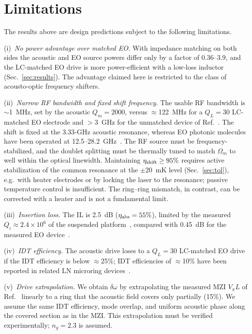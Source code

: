 \documentclass[aps,prapplied,reprint,superscriptaddress,amsmath,amssymb,floatfix]{revtex4-2}
\newcommand{\etash}{\eta_{\rm shift}}
\newcommand{\etaabs}{\eta_{\rm abs}}
\begin{document}
\section{Limitations}\label{sec:lim}
The results above are design predictions subject to the following limitations.

(i)~\emph{No power advantage over matched EO.} With impedance matching on both sides the acoustic and EO source powers differ only by a factor of 0.36--3.9, and the LC-matched EO drive is more power-efficient with a low-loss inductor (Sec.~\ref{sec:results}). The advantage claimed here is restricted to the class of acousto-optic frequency shifters.

(ii)~\emph{Narrow RF bandwidth and fixed shift frequency.} The usable RF bandwidth is $\sim$1~MHz, set by the acoustic $Q_m=2000$, versus $\approx$122~MHz for a $Q_L=30$ LC-matched EO electrode and $>$3~GHz for the unmatched device of Ref.~\cite{Hu2021}. The shift is fixed at the 3.33-GHz acoustic resonance, whereas EO photonic molecules have been operated at 12.5--28.2~GHz~\cite{Hu2021}. The RF source must be frequency-stabilized, and the doublet splitting must be thermally tuned to match $\Omega_m$ to well within the optical linewidth. Maintaining $\etash\ge95\%$ requires active stabilization of the common resonance at the $\pm20$~mK level (Sec.~\ref{sec:tol}), e.g.\ with heater electrodes or by locking the laser to the resonance; passive temperature control is insufficient. The ring--ring mismatch, in contrast, can be corrected with a heater and is not a fundamental limit.

(iii)~\emph{Insertion loss.} The IL is 2.5~dB ($\etaabs=55\%$), limited by the measured $Q_i\approx2.4\times10^6$ of the suspended platform~\cite{Shao2019}, compared with 0.45~dB for the measured EO device~\cite{Hu2021}.

(iv)~\emph{IDT efficiency.} The acoustic drive loses to a $Q_L=30$ LC-matched EO drive if the IDT efficiency is below $\approx$25\%; IDT efficiencies of $\approx$10\% have been reported in related LN microring devices~\cite{Xu2025b}.

(v)~\emph{Drive extrapolation.} We obtain $\delta\omega$ by extrapolating the measured MZI $V_\pi L$ of Ref.~\cite{Shao2019} linearly to a ring that the acoustic field covers only partially (15\%). We assume the same IDT efficiency, mode overlap, and uniform acoustic phase along the covered section as in the MZI. This extrapolation must be verified experimentally; $n_g=2.3$ is assumed.
\end{document}
